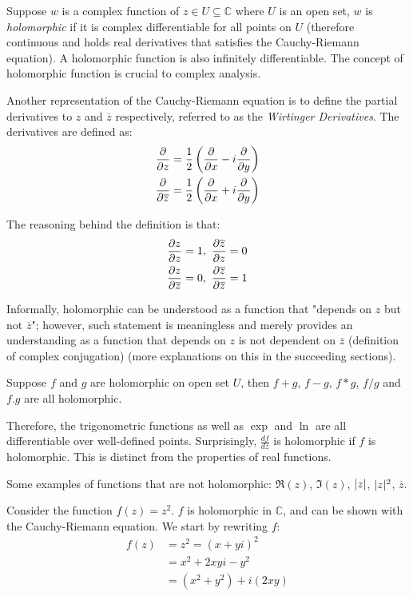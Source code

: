 \documentclass[12pt]{article}
\begin{document}
	Suppose $w$ is a complex function of $z \in U \subseteq \mathbb{C}$ where $U$ is an open set, $w$ is \textit{holomorphic} if it is complex differentiable for all points on $U$ (therefore continuous and holds real derivatives that satisfies the Cauchy-Riemann equation). A holomorphic function is also infinitely differentiable. The concept of holomorphic function is crucial to complex analysis.
	
	Another representation of the Cauchy-Riemann equation is to define the partial derivatives to $z$ and $\overline{z}$ respectively, referred to as the \textit{Wirtinger Derivatives}. The derivatives are defined as:
	\begin{align*}
		\frac{\partial}{\partial z} &= \frac{1}{2}\left(\frac{\partial}{\partial x} - i\frac{\partial}{\partial y}\right) \\
		\frac{\partial}{\partial \overline{z}} &= \frac{1}{2}\left(\frac{\partial}{\partial x} + i\frac{\partial}{\partial y}\right)
	\end{align*}
	
	The reasoning behind the definition is that:
	\begin{align*}
		\frac{\partial z}{\partial z} = 1&,\ \frac{\partial \overline{z}}{\partial z} = 0 \\
		\frac{\partial z}{\partial \overline{z}} = 0&,\ \frac{\partial \overline{z}}{\partial \overline{z}} = 1
	\end{align*}
	
	Informally, holomorphic can be understood as a function that "depends on $z$ but not $\overline{z}$";  however, such statement is meaningless and merely provides an understanding as a function that depends on $z$ is not dependent on $\overline{z}$ (definition of complex conjugation) (more explanations on this in the succeeding sections).
	
	Suppose $f$ and $g$ are holomorphic on open set $U$, then $f + g$, $f - g$, $f * g$, $f / g$ and $f.g$ are all holomorphic.
	
	Therefore, the trigonometric functions as well as $\exp$ and $\ln$ are all differentiable over well-defined points. Surprisingly, $\frac{df}{dz}$ is holomorphic if $f$ is holomorphic. This is distinct from the properties of real functions.
	
	Some examples of functions that are not holomorphic: $\Re(z)$, $\Im(z)$, $\lvert z \rvert$, $\lvert z \rvert^2$, $\overline{z}$.
	
	Consider the function $f(z) = z^2$. $f$ is holomorphic in $\mathbb{C}$, and can be shown with the Cauchy-Riemann equation. We start by rewriting $f$:
	\begin{align*}
		f(z) &= z^2 = (x + yi)^2 \\
		&= x^2 + 2xyi - y^2 \\
		&= (x^2 + y^2) + i(2xy)
	\end{align*}
	
\end{document}
